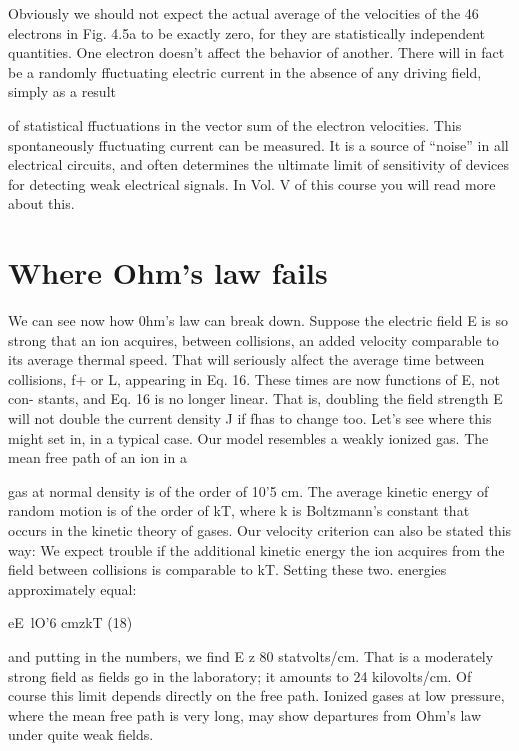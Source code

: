 Obviously we should not expect the actual average of the velocities
of the 46 electrons in Fig. 4.5a to be exactly zero, for they are statistically
independent quantities. One electron doesn't affect the behavior
of another. There will in fact be a randomly ffuctuating
electric current in the absence of any driving field, simply as a result

of statistical ffuctuations in the vector sum of the electron velocities.
This spontaneously ffuctuating current can be measured. It is a
source of ``noise'' in all electrical circuits, and often determines the
ultimate limit of sensitivity of devices for detecting weak electrical
signals. In Vol. V of this course you will read more about this.

\section{Where Ohm's law fails}

We can see now how 0hm's law can break down. Suppose the
electric field E is so strong that an ion acquires, between collisions,
an added velocity comparable to its average thermal speed. That
will seriously alfect the average time between collisions, f+ or L,
appearing in Eq. 16. These times are now functions of E, not con-
stants, and Eq. 16 is no longer linear. That is, doubling the field
strength E will not double the current density J if fhas to change too.
Let's see where this might set in, in a typical case. Our model
resembles a weakly ionized gas. The mean free path of an ion in a

gas at normal density is of the order of 10'5 cm. The average kinetic
energy of random motion is of the order of kT, where k is Boltzmann's
constant that occurs in the kinetic theory of gases. Our velocity
criterion can also be stated this way: We expect trouble if the additional
kinetic energy the ion acquires from the field between collisions
is comparable to kT. Setting these two. energies approximately
equal:

eE~lO'6 cmzkT (18)
\begin{equation}
\end{equation}

and putting in the numbers, we find E z 80 statvolts/cm. That is
a moderately strong field as fields go in the laboratory; it amounts
to 24 kilovolts/cm. Of course this limit depends directly on the free
path. Ionized gases at low pressure, where the mean free path is very
long, may show departures from Ohm's law under quite weak fields.

